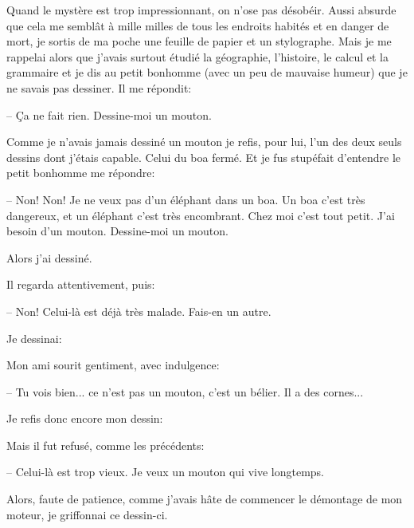 \documentclass[a4paper]{report}
\begin{document}
Quand le mystère est trop impressionnant, on n'ose pas désobéir. Aussi absurde que cela me semblât à mille milles de tous les endroits habités et en danger de mort, je sortis de ma poche une feuille de papier et un stylographe. Mais je me rappelai alors que j'avais surtout étudié la géographie, l'histoire, le calcul et la grammaire et je dis au petit bonhomme (avec un peu de mauvaise humeur) que je ne savais pas dessiner. Il me répondit:

-- Ça ne fait rien. Dessine-moi un mouton.

Comme je n'avais jamais dessiné un mouton je refis, pour lui, l'un des deux seuls dessins dont j'étais capable. Celui du boa fermé. Et je fus stupéfait d'entendre le petit bonhomme me répondre:

-- Non! Non! Je ne veux pas d'un éléphant dans un boa. Un boa c'est très dangereux, et un éléphant c'est très encombrant. Chez moi c'est tout petit. J'ai besoin d'un mouton. Dessine-moi un mouton.

Alors j'ai dessiné.


Il regarda attentivement, puis:

-- Non! Celui-là est déjà très malade. Fais-en un autre.

Je dessinai:


Mon ami sourit gentiment, avec indulgence:

-- Tu vois bien... ce n'est pas un mouton, c'est un bélier. Il a des cornes...

Je refis donc encore mon dessin: 


Mais il fut refusé, comme les précédents:

-- Celui-là est trop vieux. Je veux un mouton qui vive longtemps.

Alors, faute de patience, comme j'avais hâte de commencer le démontage de mon moteur, je griffonnai ce dessin-ci.
\end{document}
